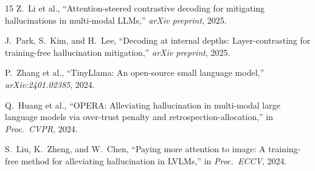 \documentclass[10pt,twocolumn]{article}
\begin{document}
\begin{thebibliography}{15}
Z.~Li et al.,
``Attention-steered contrastive decoding for mitigating hallucinations in multi-modal LLMs,''
\emph{arXiv preprint}, 2025.

J.~Park, S.~Kim, and H.~Lee,
``Decoding at internal depths: Layer-contrasting for training-free hallucination mitigation,''
\emph{arXiv preprint}, 2025.

P.~Zhang et al.,
``TinyLlama: An open-source small language model,''
\emph{arXiv:2401.02385}, 2024.

Q.~Huang et al.,
``OPERA: Alleviating hallucination in multi-modal large language models via over-trust penalty and retrospection-allocation,''
in \emph{Proc.\ CVPR}, 2024.

S.~Liu, K.~Zheng, and W.~Chen,
``Paying more attention to image: A training-free method for alleviating hallucination in LVLMs,''
in \emph{Proc.\ ECCV}, 2024.

\end{thebibliography}
\end{document}
